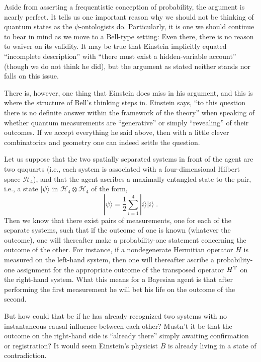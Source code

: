 \documentclass[aps,pra,superscriptaddress,10pt,tightenlines,twocolumn,nofootinbib]{revtex4}
\begin{document}
Aside from asserting a frequentistic conception of probability, the argument is nearly perfect.  It tells us one important reason why we should not be thinking of quantum states as the $\psi$-ontologists do.  Particularly, it is one we should continue to bear in mind as we move to a Bell-type setting:  Even there, there is no reason to waiver on its validity.  It may be true that Einstein implicitly equated ``incomplete description'' with ``there must exist a hidden-variable account'' (though we do not think he did), but the argument as stated neither stands nor falls on this issue.

There is, however, one thing that Einstein does miss in his argument, and this is where the structure of Bell's thinking steps in.  Einstein says, ``to this question there is no definite answer within the framework of the theory'' when speaking of whether quantum measurements are ``generative'' or simply ``revealing'' of their outcomes.  If we accept everything he said above, then with a little clever combinatorics and geometry one can indeed settle the question.

Let us suppose that the two spatially separated systems in front of the agent are two ququarts (i.e., each system is associated with a four-dimensional Hilbert space ${\mathcal H}_4$), and that the agent ascribes a maximally entangled state to the pair, i.e., a state $|\psi\rangle$ in ${\mathcal H}_4\otimes{\mathcal H}_4$ of the form,
\begin{equation}
|\psi\rangle=\frac{1}{2}\sum_{i=1}^4|i\rangle|i\rangle\;.
\end{equation}
Then we know that there exist pairs of measurements, one for each of the separate systems, such that if the outcome of one is known (whatever the outcome), one will thereafter make a probability-one statement concerning the outcome of the other.  For instance, if a nondegenerate Hermitian operator $H$ is measured on the left-hand system, then one will thereafter ascribe a probability-one assignment for the appropriate outcome of the transposed operator $H^{\rm T}$ on the right-hand system.  What this means for a Bayesian agent is that after performing the first measurement he will bet his life on the outcome of the second.

But how could that be if he has already recognized two systems with no instantaneous causal influence between each other?  Mustn't it be that the outcome on the right-hand side is ``already there'' simply awaiting confirmation or registration?  It would seem Einstein's physicist $B$ is already living in a state of contradiction.
\end{document}
